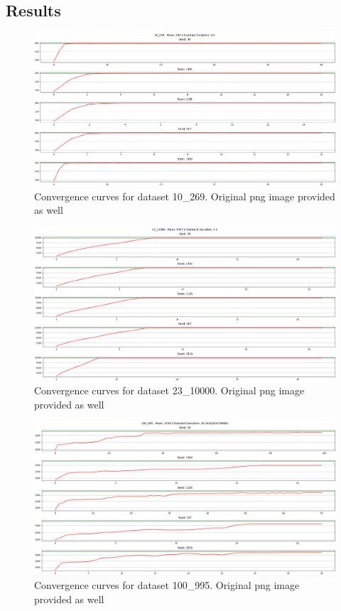 \documentclass{article}
\begin{document}
\subsection*{Results}
\begin{figure}[h]
	\centering
	\includegraphics[width=\linewidth]{10_269.png}
	\caption{Convergence curves for dataset 10\_269. Original png image provided as well}
\end{figure}
\begin{figure}[h]
	\centering
	\includegraphics[width=\linewidth]{23_10000.png}
	\caption{Convergence curves for dataset 23\_10000. Original png image provided as well}
\end{figure}
\begin{figure}[h]
	\centering
	\includegraphics[width=\linewidth]{100_995.png}
	\caption{Convergence curves for dataset 100\_995. Original png image provided as well}
\end{figure}
\clearpage
\end{document}
